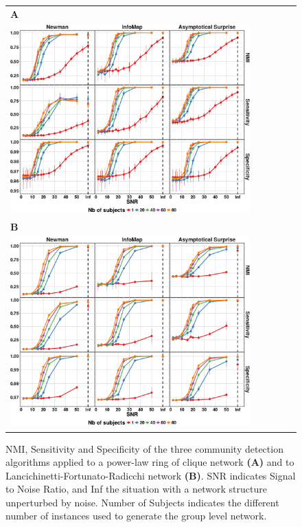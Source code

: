 \begin{figure}[!htb]
\centering
    \begin{tabular}{l}
        \textbf{\textsf{A}}  \\
        \includegraphics[width=0.85\textwidth]{images/pacopaperfigure4.pdf} \\
		\textbf{\textsf{B}}  \\
        \includegraphics[width=0.85\textwidth]{images/pacopaperfigure5.pdf}
    \end{tabular}
    \caption{NMI, Sensitivity and Specificity of the three community detection algorithms applied to a power-law ring of clique network \textbf{(A)} and to Lancichinetti-Fortunato-Radicchi network \textbf{(B)}. SNR indicates Signal to Noise Ratio, and Inf the situation with a network structure unperturbed by noise. Number of Subjects indicates the different number of instances used to generate the group level network.}
    \label{fig:nmisensitivityspecificity}
\end{figure}


